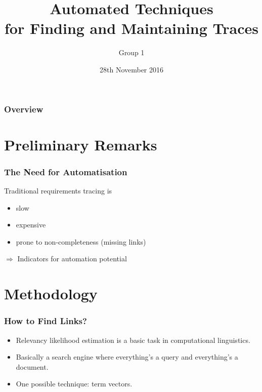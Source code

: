 \documentclass{beamer}
\title[Automated Traceability]{Automated Techniques\\for Finding and Maintaining Traces} %
\author{Group 1}
\date{28th November 2016}
\begin{document}
\begin{frame}
\titlepage
\end{frame}

\begin{frame}
\frametitle{Overview} %
\tableofcontents %
\end{frame}


\section{Preliminary Remarks}
\begin{frame}
\frametitle{The Need for Automatisation}
Traditional requirements tracing is
\begin{itemize}
\item slow
\item expensive
\item prone to non-completeness (missing links)
\end{itemize}

\vfill$\Rightarrow$ Indicators for automation potential

\end{frame}


\section{Methodology}
\begin{frame}
\frametitle{How to Find Links?}

\begin{itemize}
\item Relevancy likelihood estimation is a basic task in computational linguistics.
\item Basically a search engine where everything's a query and everything's a document.
\item One possible technique: term vectors.
\end{itemize}
\end{frame}
\end{document}
